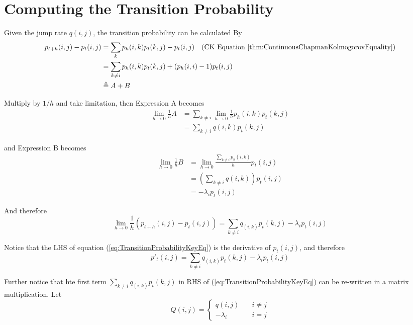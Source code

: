 \section{Computing the Transition Probability}
    Given the jump rate $q(i,j)$, the transition probability can be calculated By
    \begin{align*}
        p_{t+h}(i,j) - p_t(i,j) &= \sum_k p_h(i,k)p_t(k,j) - p_t(i,j) \quad \text{(CK Equation \ref{thm:ContinuousChapmanKolmogorovEquality})}\\
        &= \sum_{k \neq i} p_h(i,k)p_t(k,j) + (p_h(i,i)-1)p_t(i,j)\\
        &\triangleq A + B
    \end{align*}

    Multiply by $1/h$ and take limitation, then Expression A becomes
    \begin{align*}
        \lim_{h \to 0} \frac{1}{h}A &= \sum_{k \neq i}\lim_{h \to 0}\frac{1}{h}p_h(i,k)p_t(k,j)\\
        &= \sum_{k \neq i}q(i,k)p_t(k,j)
    \end{align*}

    and Expression B becomes
    \begin{align*}
        \lim_{h \to 0} \frac{1}{h}B &= \lim_{h \to 0}\frac{\sum_{k \neq i}p_h(i,k)}{h}p_t(i,j)\\
        &= \left(\sum_{k \neq i}q(i,k)\right)p_t(i,j)\\
        &= -\lambda_i p_t(i,j)
    \end{align*}

    And therefore
    \begin{equation}\label{eq:TransitionProbabilityKeyEq}
         \lim_{h \to 0}\frac{1}{h}\left(p_{t+h}(i,j) - p_t(i,j)\right) = \sum_{k \neq i}q_(i,k)p_t(k,j) - \lambda_i p_t(i,j) 
    \end{equation}

    Notice that the LHS of equation (\ref{eq:TransitionProbabilityKeyEq}) is the derivative of $p_t(i,j)$, and therefore
    \[ p'_t(i,j) = \sum_{k \neq i}q_(i,k)p_t(k,j) - \lambda_i p_t(i,j) \]

    Further notice that  hte first term $\sum_{k \neq i}q_(i,k)p_t(k,j)$ in RHS of (\ref{eq:TransitionProbabilityKeyEq}) can be re-written in a matrix multiplication. Let
    \[ Q(i,j) = \begin{cases}
        q(i,j) &\quad i \neq j\\
        -\lambda_i &\quad i = j
    \end{cases} \]

